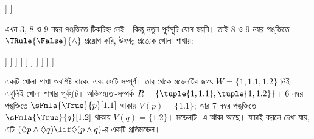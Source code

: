 \documentclass[../../../include/open-logic-section]{subfiles}
\begin{document}
{\begin{ex}
\begin{oltableau}
      ]
    ]
  \end{oltableau}
  এখন 3, 8 ও 9 নম্বর পঙ্‌ক্তিতে টিকচিহ্ন
  নেই। কিন্তু নতুন পূর্বসূচি যোগ হয়নি।
  তাই 8 ও 9 নম্বর পঙ্‌ক্তিতে
  $\TRule{\False}{\land}$ প্রয়োগ করি, উৎপন্ন
  প্রত্যেক খোলা শাখায়:
  \begin{oltableau}
    [\pFmla{\False}{(\Diamond p \land \Diamond q) \lif \Diamond(p \land q)}{1},
      just = \TAss, checked
      [\pFmla{\True}{\Diamond p \land \Diamond q}{1},
        just = {\TRule{\False}{\lif}[1]}, checked
        [\pFmla{\False}{\Diamond(p \land q)}{1},
          just = {\TRule{\False}{\lif}[1]}
          [\pFmla{\True}{\Diamond p}{1},
            just = {\TRule{\True}{\land}[2]}, checked
            [\pFmla{\True}{\Diamond q}{1},
              just = {\TRule{\True}{\land}[2]}, checked
              [\pFmla{\True}{p}{1.1},
                just = {\TRule{\True}{\Diamond}[4]}, checked
                [\pFmla{\True}{q}{1.2},
                  just = {\TRule{\True}{\Diamond}[5]}, checked
                  [\pFmla{\False}{p \land q}{1.1},
                    just = {\TRule{\False}{\Diamond}[3]}, checked
                    [\pFmla{\False}{p \land q}{1.2},
                      just = {\TRule{\False}{\Diamond}[3]}, checked
                      [\pFmla{\False}{p}{1.1},
                        just = {\TRule{\False}{\land}[8]}, checked, close
                      ]
                      [\pFmla{\False}{q}{1.1},
                        just = {\TRule{\False}{\land}[8]}, checked
                        [\pFmla{\False}{p}{1.2},
                          just = {\TRule{\False}{\land}[9]}, checked]
                        [\pFmla{\False}{q}{1.2},
                          just = {\TRule{\False}{\land}[9]}, checked, close]
                      ]
                    ]
                  ]
                ]
              ]
            ]
          ]
        ]
      ]
    ]
  \end{oltableau}
  একটি খোলা শাখা অবশিষ্ট থাকে, এবং সেটি সম্পূর্ণ।
  তার থেকে মডেলটির জগৎ
  $W = \{1, 1.1, 1.2\}$ নিই: এগুলিই খোলা
  শাখার পূর্বসূচি। অভিগম্যতা-সম্পর্ক
  $R = \{\tuple{1, 1.1}, \tuple{1, 1.2}\}$।
  6 নম্বর পঙ্‌ক্তিতে $\sFmla{\True}{p}[1.1]$
  থাকায় $V(p) = \{1.1\}$; আর 7 নম্বর
  পঙ্‌ক্তিতে $\sFmla{\True}{q}[1.2]$ থাকায়
  $V(q) = \{1.2\}$।
  মডেলটি -এ আঁকা আছে।
  যাচাই করলে দেখা যায়, এটি
  $(\Diamond p \land \Diamond q) \lif
  \Diamond (p \land q)$-র একটি প্রতিমডেল।
  \begin{figure}
  \begin{center}

\end{center}
\end{figure}
\end{ex}}
\end{document}
